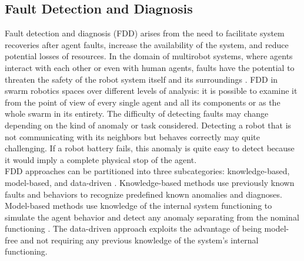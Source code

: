 \documentclass[../../Thesis.tex]{subfiles}
\begin{document}
	
	\subsection{Fault Detection and Diagnosis}
		Fault detection and diagnosis (FDD) arises from the need to facilitate system recoveries after agent faults, increase the availability of the system, and reduce potential losses of resources. In the domain of multirobot systems, where agents interact with each other or even with human agents, faults have the potential to threaten the safety of the robot system itself and its surroundings \cite{Jin-Ho1999}. 
		FDD in swarm robotics spaces over different levels of analysis: it is possible to examine it from the point of view of every single agent and all its components or as the whole swarm in its entirety. The difficulty of detecting faults may change depending on the kind of anomaly or task considered. Detecting a robot that is not communicating with its neighbors but behaves correctly may quite challenging. If a robot battery fails, this anomaly is quite easy to detect because it would imply a complete physical stop of the agent. \\
		FDD approaches can be partitioned into three subcategories: knowledge-based, model-based, and data-driven \cite{Khalastchi2018}.  Knowledge-based methods use previously known faults and behaviors to recognize predefined known anomalies and diagnoses. Model-based methods use knowledge of the internal system functioning to simulate the agent behavior and detect any anomaly separating from the nominal functioning \cite{Bader2017}. The data-driven approach exploits the advantage of being model-free and not requiring any previous knowledge of the system's internal functioning.
\end{document}
